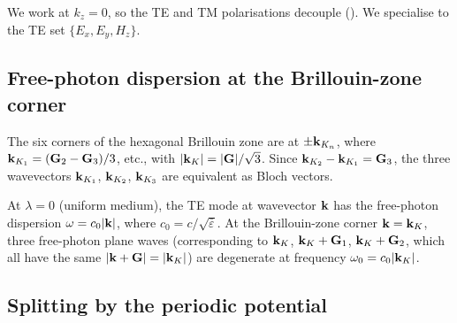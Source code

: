 We work at $k_z=0$, so the TE and TM polarisations decouple
().  We specialise to the TE set
$\{E_x,E_y,H_z\}$.

\subsection{Free-photon dispersion at the Brillouin-zone corner}
\label{sec:ch6-free-photon}

The six corners of the hexagonal Brillouin zone are at
$\pm\mathbf{k}_{K_n}$, where
$\mathbf{k}_{K_1}=(\mathbf{G}_2-\mathbf{G}_3)/3$, etc., with
$|\mathbf{k}_K|=|\mathbf{G}|/\sqrt{3}$.  Since $\mathbf{k}_{K_2}-\mathbf{k}_{K_1}=\mathbf{G}_3$,
the three wavevectors $\mathbf{k}_{K_1}$, $\mathbf{k}_{K_2}$, $\mathbf{k}_{K_3}$ are
equivalent as Bloch vectors.

At $\lambda=0$ (uniform medium), the TE mode at wavevector $\mathbf{k}$ has
the free-photon dispersion $\omega=c_0|\mathbf{k}|$, where
$c_0=c/\sqrt{\bar\varepsilon}$.  At the Brillouin-zone corner
$\mathbf{k}=\mathbf{k}_K$, three free-photon plane waves (corresponding to
$\mathbf{k}_K$, $\mathbf{k}_K+\mathbf{G}_1$, $\mathbf{k}_K+\mathbf{G}_2$, which all have the
same $|\mathbf{k}+\mathbf{G}|=|\mathbf{k}_K|$) are degenerate at frequency
$\omega_0=c_0|\mathbf{k}_K|$.

\subsection{Splitting by the periodic potential}
\label{sec:ch6-splitting}

